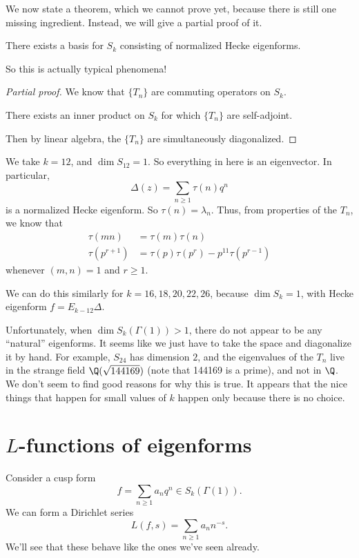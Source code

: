 \documentclass[a4paper]{article}
\begin{document}
We now state a theorem, which we cannot prove yet, because there is still one missing ingredient. Instead, we will give a partial proof of it.

\begin{thm}
  There exists a basis for $S_k$ consisting of normalized Hecke eigenforms.
\end{thm}
So this is actually typical phenomena!

\begin{proof}[Partial proof]
  We know that $\{T_n\}$ are commuting operators on $S_k$.
  \begin{fact}
    There exists an inner product on $S_k$ for which $\{T_n\}$ are self-adjoint.
  \end{fact}
  Then by linear algebra, the $\{T_n\}$ are simultaneously diagonalized.
\end{proof}

\begin{eg}
  We take $k = 12$, and $\dim S_{12} = 1$. So everything in here is an eigenvector. In particular,
  \[
    \Delta(z) = \sum_{n \geq 1} \tau(n) q^n
  \]
  is a normalized Hecke eigenform. So $\tau(n) = \lambda_n$. Thus, from properties of the $T_n$, we know that
  \begin{align*}
    \tau(mn) &= \tau(m) \tau(n)\\
    \tau(p^{r + 1}) &= \tau(p) \tau(p^r) - p^{11}\tau(p^{r - 1})
  \end{align*}
  whenever $(m, n) = 1$ and $r \geq 1$.
\end{eg}
We can do this similarly for $k = 16, 18, 20, 22, 26$, because $\dim S_k = 1$, with Hecke eigenform $f = E_{k - 12} \Delta$.

Unfortunately, when $\dim S_k(\Gamma(1)) > 1$, there do not appear to be any ``natural'' eigenforms. It seems like we just have to take the space and diagonalize it by hand. For example, $S_{24}$ has dimension $2$, and the eigenvalues of the $T_n$ live in the strange field $\Q(\sqrt{144169})$ (note that 144169 is a prime), and not in $\Q$. We don't seem to find good reasons for why this is true. It appears that the nice things that happen for small values of $k$ happen only because there is no choice.

\section{\texorpdfstring{$L$}{L}-functions of eigenforms}
Consider a cusp form
\[
  f = \sum_{n \geq 1} a_n q^n \in S_k(\Gamma(1)).
\]
We can form a Dirichlet series
\[
  L(f, s) = \sum_{n \geq 1} a_n n^{-s}.
\]
We'll see that these behave like the ones we've seen already.
\end{document}
